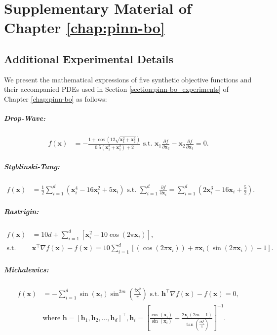 \allowdisplaybreaks
\chapter{Supplementary Material of Chapter \ref{chap:pinn-bo}} 
\label{section:pinn-bo_supp}
\section{Additional Experimental Details}
\label{section:pinn-bo_experiments_synthetic}
We present the mathematical expressions of five synthetic objective functions and their accompanied PDEs used in Section \ref{section:pinn-bo_experiments} of Chapter \ref{chap:pinn-bo} as follows: 
\paragraph{Drop-Wave:} 
\begin{align*}
    f(\mathbf{x}) &= - \frac{1 + \cos(12\sqrt{\mathbf{x}_1^2 + \mathbf{x}_2^2})}{0.5(\mathbf{x}_1^2 + \mathbf{x}_1^2) + 2} \text{ s.t. } \mathbf{x}_1 \frac{\partial f}{\partial \mathbf{x}_2} - \mathbf{x}_2 \frac{\partial f}{\partial \mathbf{x}_1} = 0.
\end{align*}
\paragraph{Styblinski-Tang:}
\begin{align*}
        f(\mathbf{x}) &= \frac{1}{2} \sum_{i=1}^{d} (\mathbf{x}_i^4 - 16\mathbf{x}_i^2 + 5\mathbf{x}_i) \text{ s.t. }  \sum_{i=1}^d \frac{\partial f}{\partial \mathbf{x}_i} = \sum_{i=1}^{d}(2\mathbf{x}_i^3 -16\mathbf{x}_i +\frac{5}{2}).
\end{align*}

\paragraph{Rastrigin:}
\begin{align*}
        f(\mathbf{x}) &= 10d + \sum_{i=1}^{d} \left[ \mathbf{x}_i^2 - 10 \cos(2\pi \mathbf{x}_i) \right], 
        \\
        \text{s.t. }  &\mathbf{x}^\top \nabla f(\mathbf{x})  - f(\mathbf{x}) = 10\sum_{i=1}^d \left[ (\cos(2\pi \mathbf{x}_i)) + \pi \mathbf{x}_i (\sin(2\pi \mathbf{x}_i)) - 1 \right].
\end{align*}
\paragraph{Michalewics:}
\begin{align*}
        f(\mathbf{x}) &= -\sum_{i=1}^{d} \sin(\mathbf{x}_i) \sin^{2m}\left(\frac{i\mathbf{x}_i^2}{\pi}\right) \text{ s.t. } \mathbf{h}^\top \nabla f(\mathbf{x}) - f(\mathbf{x}) = 0,\\ & \text{where } \mathbf{h} = [\mathbf{h}_1, \mathbf{h}_2, \dots, \mathbf{h}_d]^\top, \mathbf{h}_i = \left[\frac{\cos(\mathbf{x}_i)}{\sin(\mathbf{x}_i)} + \frac{2\mathbf{x}_i (2m-1)}{\tan(\frac{i\mathbf{x}_i^2}{\pi})}\right]^{-1}.
\end{align*}
